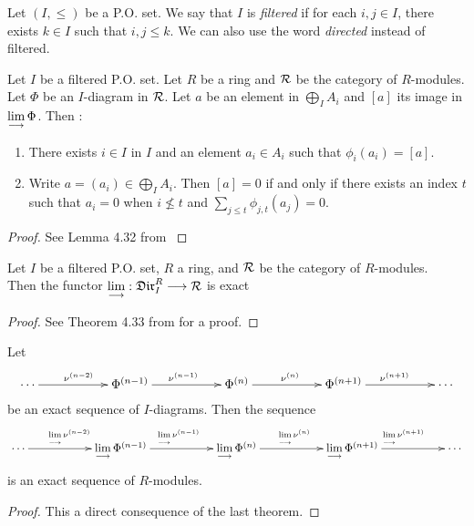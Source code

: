\documentclass[11pt, a4paper, twoside]{article}
\begin{document}
\begin{defin}
Let $(I,\leq)$ be a P.O. set. We say that $I$ is \emph{filtered} if for each $i,j\in I$, there exists $k\in I$ such that $i,j\leq k$. We can also use the word \emph{directed} instead of filtered.
\end{defin}
\begin{lemma}
Let $I$ be a filtered P.O. set. Let $R$ be a ring and $\mathcal{R}$ be the category of $R$-modules. Let $\Phi$ be an $I$-diagram in $\mathcal{R}$. Let $a$ be an element in $\bigoplus_IA_i$ and $[a]$ its image in $\lim\limits_{\longrightarrow}\Phi$. Then :
\begin{enumerate}
    \item There exists $i\in I$ in $I$ and an element $a_i\in A_i$ such that $\phi_i(a_i)=[a]$.
    \item Write $a=(a_i)\in\bigoplus_IA_i$. Then $[a]=0$ if and only if there exists an index $t$ such that $a_i=0$ when $i\nleqslant t$ and $\sum_{j\leq t}\phi_{j,t}(a_j)=0$.
\end{enumerate}
\end{lemma}
\begin{proof}
    See Lemma 4.32 from \cite{principal}
\end{proof}
\begin{thm}
    Let $I$ be a filtered P.O. set, $R$ a ring, and $\mathcal{R}$ be the category of $R$-modules. \\
    Then the functor $\lim\limits_{\longrightarrow}:\mathfrak{Dir}^R_I\longrightarrow\mathcal{R}$ is exact
\end{thm}
\begin{proof}
    See Theorem 4.33 from \cite{principal} for a proof.
\end{proof}
\begin{cor}
Let 
\begin{displaymath}
    \xymatrix{
        \cdots\ar[rr]^{\nu^{(n-2)}} & &  \Phi^{(n-1)}\ar[rr]^{\nu^{(n-1)}} & &  \Phi^{(n)}\ar[rr]^{\nu^{(n)}} & &  \Phi^{(n+1)}\ar[rr]^{\nu^{(n+1)}} & &\cdots
    }
\end{displaymath}
be an exact sequence of $I$-diagrams. Then the sequence 
\begin{displaymath}
    \xymatrix{
        \cdots\ar[rr]^{\lim\limits_{\ra}\nu^{(n-2)}} & & \lim\limits_{\ra}\Phi^{(n-1)}\ar[rr]^{\lim\limits_{\ra}\nu^{(n-1)}} & & \lim\limits_{\ra}\Phi^{(n)}\ar[rr]^{\lim\limits_{\ra}\nu^{(n)}} & &  \lim\limits_{\ra}\Phi^{(n+1)}\ar[rr]^{\lim\limits_{\ra}\nu^{(n+1)}} & & \cdots
    }
\end{displaymath}
is an exact sequence of $R$-modules.
\end{cor}
\begin{proof}
     This a direct consequence of the last theorem.
\end{proof}
\end{document}
